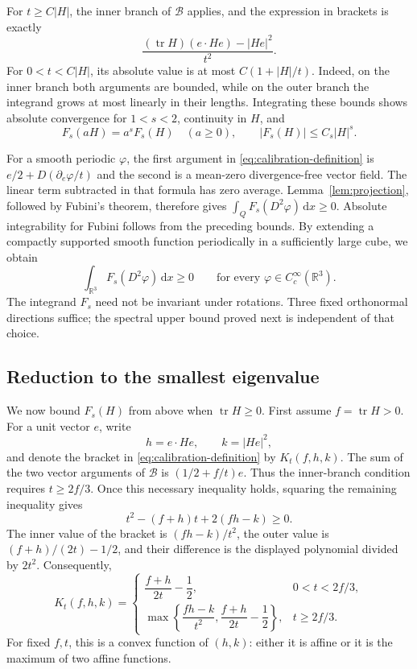 \documentclass[11pt,a4paper,reqno]{amsart}
\theoremstyle{plain}
\theoremstyle{remark}
\numberwithin{equation}{section}
\newcommand{\R}{\mathbb R}
\newcommand{\dd}{\,\mathrm d}
\DeclareMathOperator{\tr}{tr}
\begin{document}
For $t\ge C|H|$, the inner branch of $\mathcal B$ applies, and the expression in brackets is exactly
\begin{equation}\label{eq:large-t-calibration}
 \frac{(\tr H)(e\cdot He)-|He|^2}{t^2}.
\end{equation}
For $0<t<C|H|$, its absolute value is at most $C(1+|H|/t)$. Indeed, on the inner branch both arguments are bounded, while on the outer branch the integrand grows at most linearly in their lengths. Integrating these bounds shows absolute convergence for $1<s<2$, continuity in $H$, and
\begin{equation}\label{eq:calibration-growth}
 F_s(aH)=a^sF_s(H)\quad(a\ge0),\qquad
 |F_s(H)|\le C_s|H|^s.
\end{equation}

For a smooth periodic $\varphi$, the first argument in \eqref{eq:calibration-definition} is $e/2+D(\partial_e\varphi/t)$ and the second is a mean-zero divergence-free vector field. The linear term subtracted in that formula has zero average. Lemma~\ref{lem:projection}, followed by Fubini's theorem, therefore gives $\int_QF_s(D^2\varphi)\dd x\ge0$. Absolute integrability for Fubini follows from the preceding bounds. By extending a compactly supported smooth function periodically in a sufficiently large cube, we obtain
\begin{equation}\label{eq:calibration-integral}
 \int_{\R^3}F_s(D^2\varphi)\dd x\ge0
 \qquad\text{for every }\varphi\in C_c^\infty(\R^3).
\end{equation}
The integrand $F_s$ need not be invariant under rotations. Three fixed orthonormal directions suffice; the spectral upper bound proved next is independent of that choice.

\subsection{Reduction to the smallest eigenvalue}
We now bound $F_s(H)$ from above when $\tr H\ge0$. First assume $f=\tr H>0$. For a unit vector $e$, write
\[
 h=e\cdot He,\qquad k=|He|^2,
\]
and denote the bracket in \eqref{eq:calibration-definition} by $K_t(f,h,k)$. The sum of the two vector arguments of $\mathcal B$ is $(1/2+f/t)e$. Thus the inner-branch condition requires $t\ge2f/3$. Once this necessary inequality holds, squaring the remaining inequality gives
\[
 t^2-(f+h)t+2(fh-k)\ge0.
\]
The inner value of the bracket is $(fh-k)/t^2$, the outer value is $(f+h)/(2t)-1/2$, and their difference is the displayed polynomial divided by $2t^2$. Consequently,
\begin{equation}\label{eq:Kt}
 K_t(f,h,k)=
 \begin{cases}
  \dfrac{f+h}{2t}-\dfrac12,&0<t<2f/3,\\[5pt]
  \max\left\{\dfrac{fh-k}{t^2},\dfrac{f+h}{2t}-\dfrac12\right\},
       &t\ge2f/3.
 \end{cases}
\end{equation}
For fixed $f,t$, this is a convex function of $(h,k)$: either it is affine or it is the maximum of two affine functions.
\end{document}
